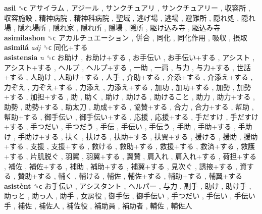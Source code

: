 \textbf{asil} ␝ϲ   アサイラム ,  アジール ,  サンクチュアリ ,  サンクチュアリー ,  収容所 ,  収容施設 ,  精神病院 ,  精神科病院 ,  聖域 ,  逃げ場 ,  逃場 ,  避難所 ,  隠れ処 ,  隠れ場 ,  隠れ場所 ,  隠れ家 ,  隠れ所 ,  隠場 ,  隠所 ,  駆け込み寺 ,  駆込み寺   \\
\textbf{asimilashon} ␝ϲ   アカルチュエーション ,  併合 ,  同化 ,  同化作用 ,  吸収 ,  摂取   \\
\textbf{asimilá} \emph{adj}  ␝ϲ   同化+する   \\
\textbf{asistensia} \emph{n}  ␝ϲ   お助け ,  お助け+する ,  お手伝い ,  お手伝い+する ,  アシスト ,  アシスト+する ,  ヘルプ ,  ヘルプ+する ,  一助 ,  一肩 ,  与力 ,  与力+する ,  世話+する ,  人助け ,  人助け+する ,  人手 ,  介助+する ,  介添+する ,  介添え+する ,  力ぞえ ,  力ぞえ+する ,  力添え ,  力添え+する ,  加功 ,  加功+する ,  加勢 ,  加勢+する ,  加担+する ,  助 ,  助く ,  助け ,  助ける ,  助けること ,  助力 ,  助力+する ,  助勢 ,  助勢+する ,  助太刀 ,  助成+する ,  協賛+する ,  合力 ,  合力+する ,  幇助 ,  幇助+する ,  御手伝い ,  御手伝い+する ,  応援 ,  応援+する ,  手だすけ ,  手だすけ+する ,  手つだい ,  手つだう ,  手伝 ,  手伝い ,  手伝う ,  手助 ,  手助+する ,  手助け ,  手助け+する ,  扶く ,  扶ける ,  扶助+する ,  扶翼+する ,  援ける ,  援助 ,  援助+する ,  支援 ,  支援+する ,  救ける ,  救助+する ,  救援+する ,  救済+する ,  救護+する ,  片肌脱ぐ ,  羽翼 ,  羽翼+する ,  翼賛 ,  肩入れ ,  肩入れ+する ,  荷担+する ,  補佐 ,  補佐+する ,  補助 ,  補助+する ,  補翼+する ,  見次ぐ ,  誘掖+する ,  資する ,  賛助+する ,  輔く ,  輔ける ,  輔佐 ,  輔佐+する ,  輔助+する ,  輔翼+する   \\
\textbf{asistènt} ␝ϲ   お手伝い ,  アシスタント ,  ヘルパー ,  与力 ,  副手 ,  助け ,  助け手 ,  助っと ,  助っ人 ,  助手 ,  女房役 ,  御手伝 ,  御手伝い ,  手つだい ,  手伝い ,  手伝い手 ,  補佐 ,  補佐人 ,  補佐役 ,  補助員 ,  補助者 ,  輔佐 ,  輔佐人   \\
